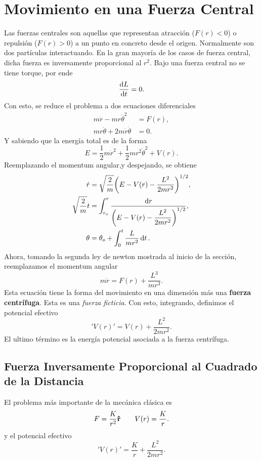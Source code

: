 \section{Movimiento en una Fuerza Central}
Las fuerzas centrales son aquellas que representan atracción ($F(r) < 0$) o repulsión ($F(r) > 0$) a un punto en concreto desde el origen. Normalmente son dos partículas interactuando. En la gran mayoría de los casos de fuerza central, dicha fuerza es inversamente proporcional al $r^2$. Bajo una fuerza central no se tiene torque, por ende
\begin{equation}
    \dv{L}{t} = 0.
\end{equation}
Con esto, se reduce el problema a dos ecuaciones diferenciales
\begin{align*}
    m\ddot{r} - mr\dot{\theta} ^2 &= F(r), \\
    mr\ddot{\theta} + 2m\dot{r} \dot{\theta} &= 0.
\end{align*}
Y sabiendo que la energía total es de la forma
\begin{equation}
    E = \frac{1}{2} m\dot{r} ^2 + \frac{1}{2} mr^2 \dot{\theta}^2 + V(r).
\end{equation}
Reemplazando el momentum angular,y despejando, se obtiene
\begin{align}
    \dot{r} &= \sqrt{\frac{2}{m}}\qty(E - V(r) - \frac{L^2}{2mr^2})^{1/2}, \\
    \sqrt{\frac{2}{m}} t &= \int _{r_o} ^r \frac{\dd{r}}{\qty(E - V(r) - \dfrac{L^2}{2mr^2})^{1/2}}, \\
    \theta &= \theta _o + \int _0 ^t \frac{L}{mr^2} \dd{t}.
\end{align}
Ahora, tomando la segunda ley de newton mostrada al inicio de la sección, reemplazamos el momentum angular
\begin{equation}
    m\ddot{r} = F(r) + \frac{L^3}{mr^3}.
\end{equation}
Esta ecuación tiene la forma del movimiento en una dimensión más una \textbf{fuerza centrífuga}. Esta es una \textit{fuerza ficticia}. Con esto, integrando, definimos el potencial efectivo
\begin{equation}
    'V(r)' = V(r) + \frac{L^2}{2mr^2}.
\end{equation}
El ultimo término es la energía potencial asociada a la fuerza centrífuga. 

\subsection{Fuerza Inversamente Proporcional al Cuadrado de la Distancia}
El problema más importante de la mecánica clásica es
    \begin{equation}
        F = \frac{K}{r^2} \vu{r} \qquad V(r) = \frac{K}{r}.
    \end{equation}
y el potencial efectivo
    \begin{equation}
        'V(r)' = \frac{K}{r} + \frac{L^2}{2mr^2}.
    \end{equation}

